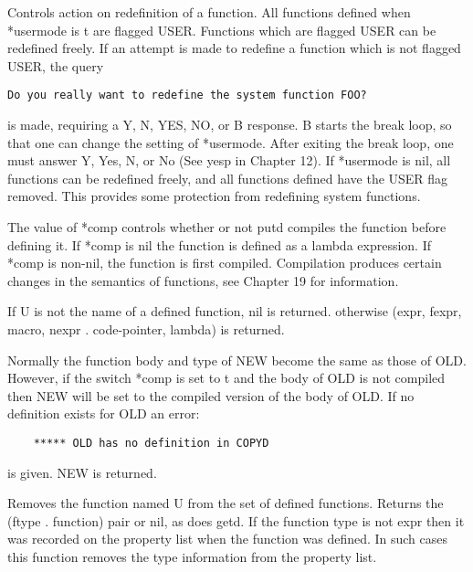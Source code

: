 { Controls   action  on  redefinition  of  a  function.    All
    functions defined when *usermode  is  t  are  flagged  USER.
    Functions  which  are  flagged USER can be redefined freely.
    If an attempt is made to redefine a function  which  is  not
    flagged USER, the query

     {\tt Do you really want to redefine the system function FOO?}

    is  made,  requiring  a  Y,  N,  YES,  NO, or B response.  B
    starts the break loop, so that one can change the setting of
    *usermode.  After exiting the break loop, one must answer Y,
    Yes, N, or No (See yesp in Chapter 12).    If  *usermode  is
    nil,   all  functions  can  be  redefined  freely,  and  all
    functions defined    have  the  USER  flag  removed.    This
    provides some protection from redefining system functions.
}

{
    The  value  of *comp controls  whether or not putd  compiles
    the  function before  defining it.   If  *comp  is  nil  the
    function  is  defined  as  a lambda expression.  If *comp is
    non-nil,  the  function  is  first  compiled.    Compilation
    produces  certain changes in the semantics of functions, see
    Chapter 19 for information.
}

{    If U is not the name of a defined function, nil is returned.
    otherwise
    ({expr, fexpr, macro, nexpr} . {code-pointer, lambda})    is
    returned.
}

{    Normally  the  function body and type of NEW become the same
    as those of OLD.  However, if the switch *comp is set  to  t
    and  the body of OLD is not compiled then NEW will be set to
    the compiled version of the body of OLD.  If  no  definition
    exists for OLD an error:
}
\begin{verbatim}
    ***** OLD has no definition in COPYD
\end{verbatim}
    is given.  NEW is returned.


{    Removes the  function  named  U  from  the  set  of  defined
    functions.    Returns the (ftype . function) pair or nil, as
    does getd.  If the function type is not  expr  then  it  was
    recorded on the property list when the function was defined.
    In  such  cases  this  function removes the type information
    from the property list.
}
